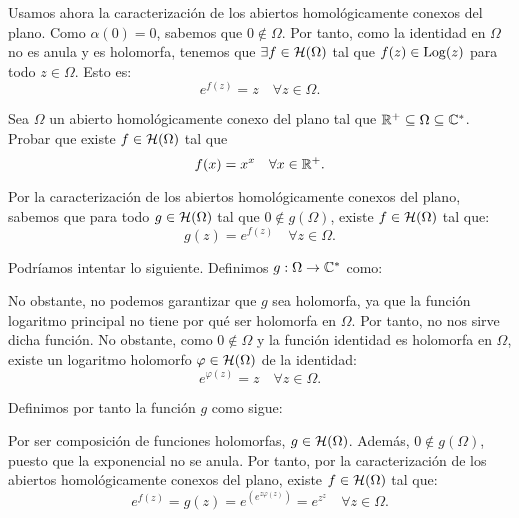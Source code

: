 \begin{ejercicio}
    Usamos ahora la caracterización de los abiertos homológicamente conexos del plano. Como $\alpha(0)=0$, sabemos que $0\notin \Omega$. Por tanto, como la identidad en $\Omega$ no es anula y es holomorfa, tenemos que $\exists f \in \mathcal{H}(\Omega)$ tal que $f(z) \in \operatorname{Log}(z)$ para todo $z \in \Omega$. Esto es:
    \begin{equation*}
        e^{f(z)} = z \quad \forall z \in \Omega.
    \end{equation*}
\end{ejercicio}

\begin{ejercicio}
    Sea $\Omega$ un abierto homológicamente conexo del plano tal que $\mathbb{R}^+ \subseteq \Omega \subseteq \mathbb{C}^*$. Probar que existe $f \in \mathcal{H}(\Omega)$ tal que
    \begin{equation*}
        f(x) = x^x \quad \forall x \in \mathbb{R}^+.
    \end{equation*}

    Por la caracterización de los abiertos homológicamente conexos del plano, sabemos que para todo $g\in \mathcal{H}(\Omega)$ tal que $0\notin g(\Omega)$, existe $f \in \mathcal{H}(\Omega)$ tal que:
    \begin{equation*}
        g(z) = e^{f(z)} \quad \forall z \in \Omega.
    \end{equation*}

    Podríamos intentar lo siguiente. Definimos $g : \Omega \to \mathbb{C}^*$ como:

    No obstante, no podemos garantizar que $g$ sea holomorfa, ya que la función logaritmo principal no tiene por qué ser holomorfa en $\Omega$. Por tanto, no nos sirve dicha función. No obstante, como $0\notin \Omega$ y la función identidad es holomorfa en $\Omega$, existe un logaritmo holomorfo $\varphi\in \mathcal{H}(\Omega)$ de la identidad:
    \begin{equation*}
        e^{\varphi(z)} = z \quad \forall z \in \Omega.
    \end{equation*}

    Definimos por tanto la función $g$ como sigue:

    Por ser composición de funciones holomorfas, $g\in \mathcal{H}(\Omega)$. Además, $0\notin g(\Omega)$, puesto que la exponencial no se anula. Por tanto, por la caracterización de los abiertos homológicamente conexos del plano, existe $f \in \mathcal{H}(\Omega)$ tal que:
    \begin{equation*}
        e^{f(z)} = g(z) = e^{\left(e^{z\varphi(z)}
        \right)}
        = e^{z^z}
        \quad \forall z \in \Omega.
    \end{equation*}


\end{ejercicio}
